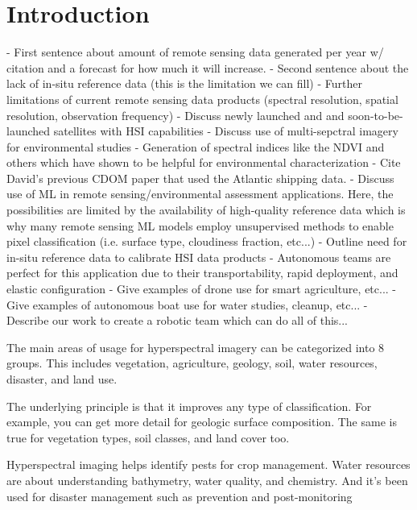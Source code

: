 \documentclass[journal,article,submit,pdftex,moreauthors]{Definitions/mdpi}
\begin{document}
\section{Introduction}

- First sentence about amount of remote sensing data generated per year w/ citation and a forecast for how much it will increase. 
- Second sentence about the lack of in-situ reference data (this is the limitation we can fill) 
- Further limitations of current remote sensing data products (spectral resolution, spatial resolution, observation frequency)
- Discuss newly launched and and soon-to-be-launched satellites with HSI capabilities
- Discuss use of multi-sepctral imagery for environmental studies
    - Generation of spectral indices like the NDVI and others which have shown to be helpful for environmental characterization
    - Cite David's previous CDOM paper that used the Atlantic shipping data.
- Discuss use of ML in remote sensing/environmental assessment applications. Here, the possibilities are limited by the availability of high-quality reference data which is why many remote sensing ML models employ unsupervised methods to enable pixel classification (i.e. surface type, cloudiness fraction, etc...)
- Outline need for in-situ reference data to calibrate HSI data products
- Autonomous teams are perfect for this application due to their transportability, rapid deployment, and elastic configuration
- Give examples of drone use for smart agriculture, etc... 
- Give examples of autonomous boat use for water studies, cleanup, etc... 
- Describe our work to create a robotic team which can do all of this... 


The main areas of usage for hyperspectral imagery can be categorized into 8 groups. This includes vegetation, agriculture, geology, soil, water resources, disaster, and land use.

The underlying principle is that it improves any type of classification. For example, you can get more detail for geologic surface composition. The same is true for vegetation types, soil classes, and land cover too.

Hyperspectral imaging helps identify pests for crop management. Water resources are about understanding bathymetry, water quality, and chemistry. And it’s been used for disaster management such as prevention and post-monitoring
\end{document}
